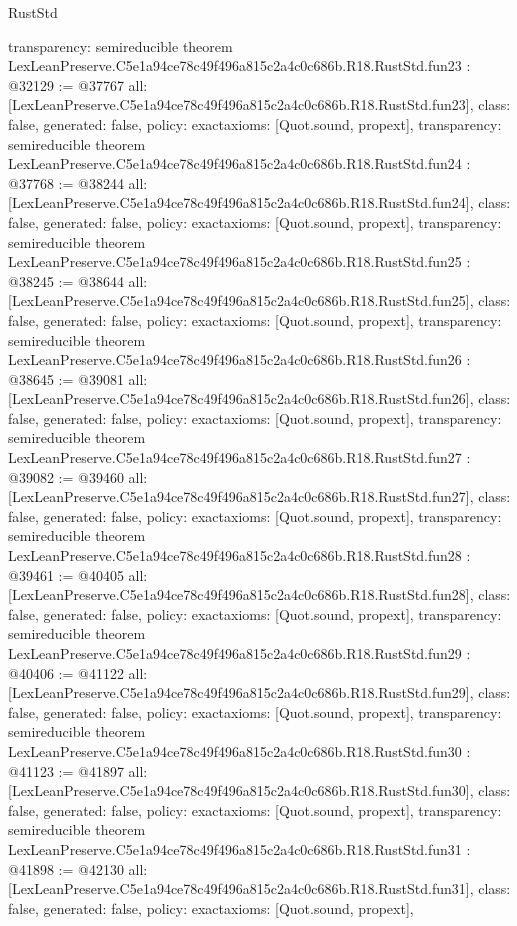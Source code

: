 \begin{lexlean}{RustStd}
\begin{coremodule}
{  transparency: semireducible
}
theorem LexLeanPreserve.C5e1a94ce78c49f496a815c2a4c0c686b.R18.RustStd.fun23 : @32129 := @37767 {
  all: [LexLeanPreserve.C5e1a94ce78c49f496a815c2a4c0c686b.R18.RustStd.fun23],
  class: false,
  generated: false,
  policy: exact{axioms: [Quot.sound, propext]},
  transparency: semireducible
}
theorem LexLeanPreserve.C5e1a94ce78c49f496a815c2a4c0c686b.R18.RustStd.fun24 : @37768 := @38244 {
  all: [LexLeanPreserve.C5e1a94ce78c49f496a815c2a4c0c686b.R18.RustStd.fun24],
  class: false,
  generated: false,
  policy: exact{axioms: [Quot.sound, propext]},
  transparency: semireducible
}
theorem LexLeanPreserve.C5e1a94ce78c49f496a815c2a4c0c686b.R18.RustStd.fun25 : @38245 := @38644 {
  all: [LexLeanPreserve.C5e1a94ce78c49f496a815c2a4c0c686b.R18.RustStd.fun25],
  class: false,
  generated: false,
  policy: exact{axioms: [Quot.sound, propext]},
  transparency: semireducible
}
theorem LexLeanPreserve.C5e1a94ce78c49f496a815c2a4c0c686b.R18.RustStd.fun26 : @38645 := @39081 {
  all: [LexLeanPreserve.C5e1a94ce78c49f496a815c2a4c0c686b.R18.RustStd.fun26],
  class: false,
  generated: false,
  policy: exact{axioms: [Quot.sound, propext]},
  transparency: semireducible
}
theorem LexLeanPreserve.C5e1a94ce78c49f496a815c2a4c0c686b.R18.RustStd.fun27 : @39082 := @39460 {
  all: [LexLeanPreserve.C5e1a94ce78c49f496a815c2a4c0c686b.R18.RustStd.fun27],
  class: false,
  generated: false,
  policy: exact{axioms: [Quot.sound, propext]},
  transparency: semireducible
}
theorem LexLeanPreserve.C5e1a94ce78c49f496a815c2a4c0c686b.R18.RustStd.fun28 : @39461 := @40405 {
  all: [LexLeanPreserve.C5e1a94ce78c49f496a815c2a4c0c686b.R18.RustStd.fun28],
  class: false,
  generated: false,
  policy: exact{axioms: [Quot.sound, propext]},
  transparency: semireducible
}
theorem LexLeanPreserve.C5e1a94ce78c49f496a815c2a4c0c686b.R18.RustStd.fun29 : @40406 := @41122 {
  all: [LexLeanPreserve.C5e1a94ce78c49f496a815c2a4c0c686b.R18.RustStd.fun29],
  class: false,
  generated: false,
  policy: exact{axioms: [Quot.sound, propext]},
  transparency: semireducible
}
theorem LexLeanPreserve.C5e1a94ce78c49f496a815c2a4c0c686b.R18.RustStd.fun30 : @41123 := @41897 {
  all: [LexLeanPreserve.C5e1a94ce78c49f496a815c2a4c0c686b.R18.RustStd.fun30],
  class: false,
  generated: false,
  policy: exact{axioms: [Quot.sound, propext]},
  transparency: semireducible
}
theorem LexLeanPreserve.C5e1a94ce78c49f496a815c2a4c0c686b.R18.RustStd.fun31 : @41898 := @42130 {
  all: [LexLeanPreserve.C5e1a94ce78c49f496a815c2a4c0c686b.R18.RustStd.fun31],
  class: false,
  generated: false,
  policy: exact{axioms: [Quot.sound, propext]},
}
\end{coremodule}
\end{lexlean}
